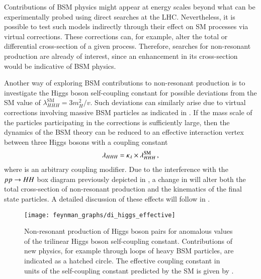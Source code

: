 Contributions of BSM physics might appear at energy scales beyond what can be
experimentally probed using direct searches at the LHC. Nevertheless, it is
possible to test such models indirectly through their effect on SM processes via
virtual corrections. These corrections can, for example, alter the total or
differential cross-section of a given process. Therefore, searches for
non-resonant \HH production are already of interest, since an enhancement in its
cross-section would be indicative of BSM physics.

Another way of exploring BSM contributions to non-resonant \HH production is to
investigate the Higgs boson self-coupling constant for possible deviations from
the SM value of $\lambda_{HHH}^\text{SM} = 3 m_{H}^2 / v$. Such deviations can
similarly arise due to virtual corrections involving massive BSM particles as
indicated in . If the mass scale of the particles
participating in the corrections is sufficiently large, then the dynamics of the
BSM theory can be reduced to an effective interaction vertex between three Higgs
bosons with a coupling constant
\begin{align*}
  \lambda_{HHH} = \kappa_{\lambda} \times \lambda_{HHH}^{\text{SM}} \,\text{,}
\end{align*}
where \klambda is an arbitrary coupling modifier. Due to the interference with
the $pp \to HH$ box diagram previously depicted in
, a change in \klambda will alter both the total
cross-section of non-resonant \HH production and the kinematics of the final
state particles. A detailed discussion of these effects will follow in
.

\begin{figure}[htbp]
  \centering

  \texttt{[image: feynman\_graphs/di\_higgs\_effective]}

  \caption{Non-resonant production of Higgs boson pairs for anomalous values of
    the trilinear Higgs boson self-coupling constant.  Contributions of new
    physics, for example through loops of heavy BSM particles, are indicated as
    a hatched circle. The effective coupling constant in units of the
    self-coupling constant predicted by the SM is given by \klambda.}%
  \label{fig:bsm_hh_prod_feyn}
\end{figure}


